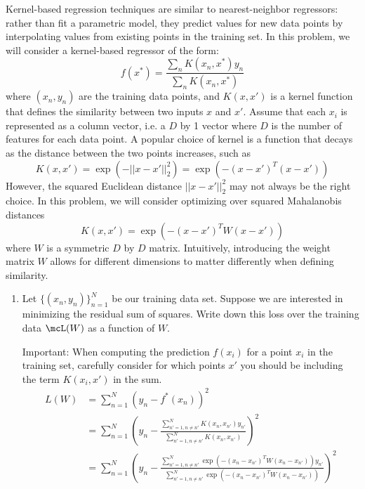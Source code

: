 \documentclass[submit]{harvardml}
\begin{document}


\begin{problem}

Kernel-based regression techniques are similar to nearest-neighbor
regressors: rather than fit a parametric model, they predict values
for new data points by interpolating values from existing points in
the training set.  In this problem, we will consider a kernel-based
regressor of the form:
\begin{equation*}
  f(x^*) = \frac{ \sum_{n} K(x_n,x^*) y_n  }{ \sum_{n} K(x_n,x^*) } 
\end{equation*}
where $(x_n,y_n)$ are the training data points, and $K(x,x')$ is a
kernel function that defines the similarity between two inputs $x$ and
$x'$. Assume that each $x_i$ is represented as a column vector, i.e. a
$D$ by 1 vector where $D$ is the number of features for each data
point. A popular choice of kernel is a function that decays as the
distance between the two points increases, such as
\begin{equation*}
  K(x,x') = \exp(-||x-x'||^2_2) = \exp(-(x-x')^T (x-x') ) 
\end{equation*} 
However, the squared Euclidean distance $||x-x'||^2_2$ may not always
be the right choice.  In this problem, we will consider optimizing
over squared Mahalanobis distances
\begin{equation*}
  K(x,x') = \exp(-(x-x')^T W (x-x') )
  \label{eqn:distance}
\end{equation*} 
where $W$ is a symmetric $D$ by $D$ matrix.  Intuitively, introducing
the weight matrix $W$ allows for different dimensions to matter
differently when defining similarity.

\begin{enumerate}

\item Let $\{(x_n,y_n)\}_{n=1}^N$ be our training data set.  Suppose
  we are interested in minimizing the residual sum of squares.  Write down this
  loss over the training data $\mcL(W)$ as a function of $W$.

  Important: When computing the prediction $f(x_i)$ for a point $x_i$
  in the training set, carefully consider for which points $x'$ you should be including
  the term $K(x_i,x')$ in the sum.
      \begin{equation*}
      \begin{split}
        L(W) & = \sum_{n=1}^{N}(y_n-f^*(x_n))^2 \\
        & = \sum_{n=1}^{N}\left(y_n-\frac{\sum_{n'=1,n\neq n'}^{N}K(x_n,x_{n'})y_{n'}}{\sum_{n'=1,n\neq n'}^{N}K(x_n,x_{n'})}\right)^2 \\
        & = \sum_{n=1}^{N}\left(y_n-\frac{\sum_{n'=1,n\neq n'}^{N}\exp(-(x_n-x_{n'})^T W (x_n-x_{n'}) )y_{n'}}{\sum_{n'=1,n\neq n'}^{N}\exp(-(x_n-x_{n'})^T W (x_n-x_{n'}) )}\right)^2
      \end{split}
      \end{equation*}


\end{enumerate}
\end{problem}
\end{document}
